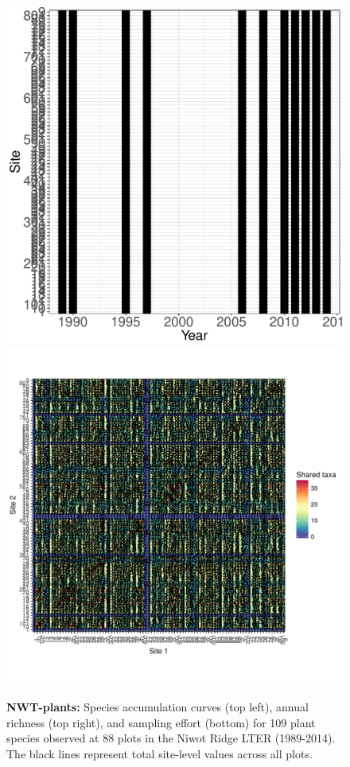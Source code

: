 \documentclass[11pt, oneside]{article}
\begin{document}
\begin{figure}[h!]
\includegraphics[scale = 0.4]{nwt-plants-hallett_spatiotemporal_sampling_effort.pdf}
\includegraphics[scale = 0.4]{nwt-plants-hallett_spp_shared.pdf}
\caption{{\bf NWT-plants:} Species accumulation curves (top left),  annual richness (top right), and sampling effort (bottom)  for 109 plant species observed at 88 plots in the Niwot Ridge LTER (1989-2014). The black lines represent total site-level values across all plots.}
\label{nwt-plants}
\end{figure}
\end{document}
